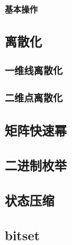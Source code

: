 \documentclass{article}
\begin{document}
\begin{titlepage}

\thispagestyle{empty}
\pagebreak
\textbf{基本操作}
\pagestyle{plain}
\tableofcontents
\end{titlepage}


\hspace{3em}
\subsection{﻿离散化}
\subsubsection{一维线离散化}

\subsubsection{二维点离散化}


\subsection{矩阵快速幂}


\subsection{二进制枚举}


\subsection{状态压缩}


\subsection{bitset}

\end{document}

